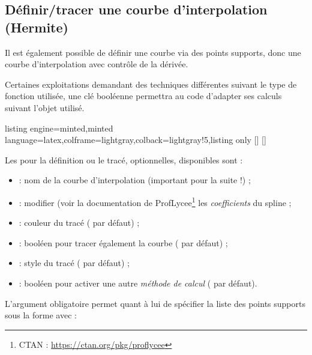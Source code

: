 \documentclass[11pt,a4paper]{ltxdoc}
\begin{document}
\newpage

\subsection{Définir/tracer une courbe d'interpolation (Hermite)}\label{deftracfctspline}

Il est également possible de définir une courbe via des points supports, donc une courbe d'interpolation avec contrôle de la dérivée.

\smallskip

Certaines exploitations demandant des techniques différentes suivant le type de fonction utilisée, une clé booléenne  permettra au code d'adapter ses calculs suivant l'objet utilisé.

\begin{tcblisting}{listing engine=minted,minted language=latex,colframe=lightgray,colback=lightgray!5,listing only}
[\macronomspline]
[\macronomspline]
\end{tcblisting}

Les \MontreCode{[clés]} pour la définition ou le tracé, optionnelles, disponibles sont :

\smallskip

\begin{itemize}
	\item {} : nom de la courbe d'interpolation (important pour la suite !) ;
	\item {} : modifier (voir la documentation de \textsf{ProfLycee}\footnote{CTAN : \url{https://ctan.org/pkg/proflycee}} les \textit{coefficients} du spline ;
	\item {} : couleur du tracé ( par défaut) ;
	\item {} : booléen pour tracer également la courbe ( par défaut) ;
	\item {} : style du tracé ( par défaut) ;
	\item {} : booléen pour activer une autre \textit{méthode de calcul} ( par défaut).
\end{itemize}

L'argument obligatoire permet quant à lui de spécifier la liste des points supports sous la forme  avec :
\end{document}
